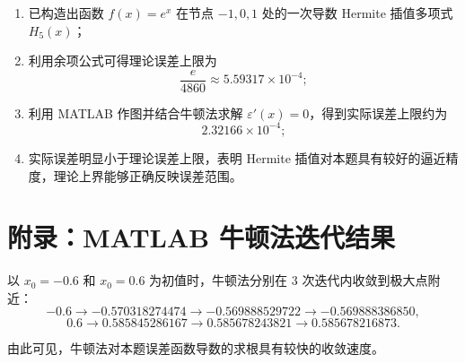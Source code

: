 \documentclass[12pt,a4paper]{ctexart}
\begin{document}
\begin{enumerate}
    \item 已构造出函数 $f(x)=e^x$ 在节点 $-1,0,1$ 处的一次导数 Hermite 插值多项式 $H_5(x)$；
    \item 利用余项公式可得理论误差上限为
    \[
    \frac{e}{4860}\approx 5.59317\times 10^{-4};
    \]
    \item 利用 MATLAB 作图并结合牛顿法求解 $\varepsilon'(x)=0$，得到实际误差上限约为
    \[
    2.32166\times 10^{-4};
    \]
    \item 实际误差明显小于理论误差上限，表明 Hermite 插值对本题具有较好的逼近精度，理论上界能够正确反映误差范围。
\end{enumerate}

\appendix
\pagestyle{plain}
\markboth{}{}

\clearpage
\section*{附录：MATLAB 牛顿法迭代结果}

以 $x_0=-0.6$ 和 $x_0=0.6$ 为初值时，牛顿法分别在 $3$ 次迭代内收敛到极大点附近：
\[
-0.6\to -0.570318274474\to -0.569888529722\to -0.569888386850,
\]
\[
0.6\to 0.585845286167\to 0.585678243821\to 0.585678216873.
\]

由此可见，牛顿法对本题误差函数导数的求根具有较快的收敛速度。
\end{document}
